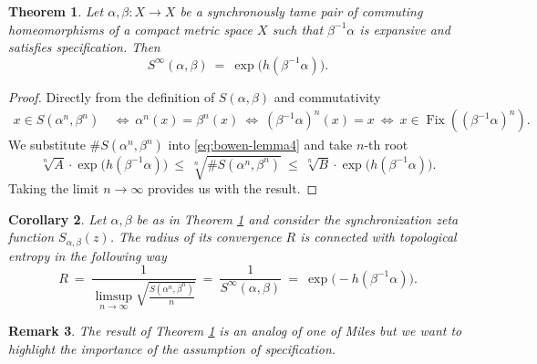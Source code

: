 \documentclass[oneside]{amsart}
\def\Fix{\operatorname{Fix}}
\newtheorem{thm}{Theorem}
\newtheorem{rmk}[thm]{Remark}
\newtheorem{col}[thm]{Corollary}
\begin{document}
\begin{thm} \label{thm:growth=entropy}
  Let $\alpha, \beta: X \to X$ be a synchronously tame pair of commuting homeomorphisms of a compact metric space $X$
  such that $\beta^{-1}\alpha$ is expansive and satisfies specification.
  Then
  \begin{equation*}
    S^\infty(\alpha, \beta) \ = \ \exp \big( h(\beta^{-1}\alpha) \big).
  \end{equation*}
\end{thm}
\begin{proof}
  Directly from the definition of $S(\alpha, \beta)$ and commutativity
  \begin{align*}
    x \in S(\alpha^n, \beta^n) \ &\Leftrightarrow \ \alpha^n(x) = \beta^n(x)
    \ \Leftrightarrow \ (\beta^{-1}\alpha)^n(x) = x
    \ \Leftrightarrow \ x \in \Fix \left( (\beta^{-1}\alpha)^n \right).
  \end{align*}
  We substitute $\# S(\alpha^n, \beta^n)$ into \eqref{eq:bowen-lemma4} and take $n$-th root
  \begin{equation*}
    \sqrt[n]{A} \cdot \exp \big( h(\beta^{-1}\alpha) \big)
      \ \leq \ \sqrt[n]{\# S(\alpha^n, \beta^n)}
      \ \leq \ \sqrt[n]{B} \cdot \exp \big( h(\beta^{-1}\alpha) \big).
  \end{equation*}
  Taking the limit $n \to \infty$ provides us with the result.
\end{proof}

\begin{col}
  Let $\alpha, \beta$ be as in {\rm Theorem \ref{thm:growth=entropy}}
  and consider the synchronization zeta function $S_{\alpha,\beta}(z)$.
  The radius of its convergence $R$ is connected with topological entropy
  in the following way
  \begin{equation*}
    R \ = \ \frac{1}{\limsup_{n \to \infty} \sqrt{\frac{S(\alpha^n, \beta^n)}{n}}}
      \ = \ \frac{1}{S^\infty(\alpha, \beta)}
      \ = \ \exp \big(-h(\beta^{-1}\alpha) \big).
  \end{equation*}
\end{col}




\begin{rmk}
  The result of {\rm Theorem \ref{thm:growth=entropy}} is an analog of one of Miles \cite[Theorem~2.2]{Miles13}
  but we want to highlight the importance of the assumption of specification.
\end{rmk}
\end{document}
